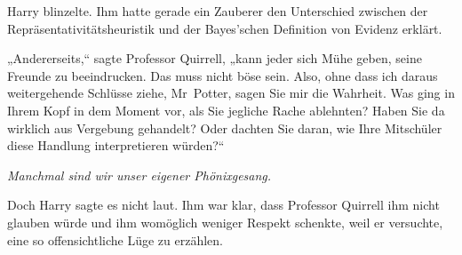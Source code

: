 Harry blinzelte. Ihm hatte gerade ein Zauberer den Unterschied zwischen der Repräsentativitätsheuristik und der Bayes’schen Definition von Evidenz erklärt.

„Andererseits,“ sagte Professor Quirrell, „kann jeder sich Mühe geben, seine Freunde zu beeindrucken. Das muss nicht böse sein. Also, ohne dass ich daraus weitergehende Schlüsse ziehe, Mr~Potter, sagen Sie mir die Wahrheit. Was ging in Ihrem Kopf in dem Moment vor, als Sie jegliche Rache ablehnten? Haben Sie da wirklich aus Vergebung gehandelt? Oder dachten Sie daran, wie Ihre Mitschüler diese Handlung interpretieren würden?“

\emph{Manchmal sind wir unser eigener Phönixgesang.}

Doch Harry sagte es nicht laut. Ihm war klar, dass Professor Quirrell ihm nicht glauben würde und ihm womöglich weniger Respekt schenkte, weil er versuchte, eine so offensichtliche Lüge zu erzählen.

